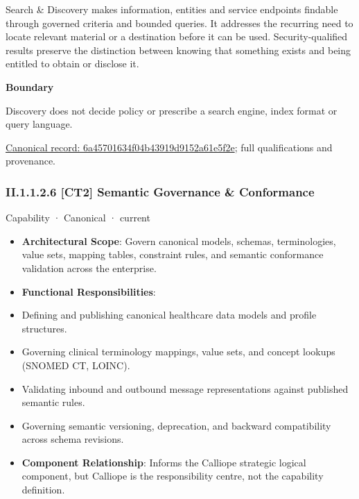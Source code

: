 Search \& Discovery makes information, entities and service endpoints findable through governed criteria and bounded queries. It addresses the recurring need to locate relevant material or a destination before it can be used. Security-qualified results preserve the distinction between knowing that something exists and being entitled to obtain or disclose it.



\textbf{Boundary}



Discovery does not decide policy or prescribe a search engine, index format or query language.


{\footnotesize \href{../../../../continuum/strategy/capability/6a45701634f04b43919d9152a61e5f2e.md}{Canonical record: 6a45701634f04b43919d9152a61e5f2e}; full qualifications and provenance.}\par
\subsubsection*{II.1.1.2.6 [CT2] Semantic Governance \& Conformance}
\label{navigation:II.1.1.2.6}

\label{element:9ee41437bd4c4bd18389f05c12108f97}
{\small Capability · Canonical · current}\par

\begin{itemize}


\item \textbf{Architectural Scope}: Govern canonical models, schemas, terminologies, value sets, mapping tables, constraint rules, and semantic conformance validation across the enterprise.

\item \textbf{Functional Responsibilities}:

\item Defining and publishing canonical healthcare data models and profile structures.

\item Governing clinical terminology mappings, value sets, and concept lookups (SNOMED CT, LOINC).

\item Validating inbound and outbound message representations against published semantic rules.

\item Governing semantic versioning, deprecation, and backward compatibility across schema revisions.

\item \textbf{Component Relationship}: Informs the Calliope strategic logical component, but Calliope is the responsibility centre, not the capability definition.

\end{itemize}


